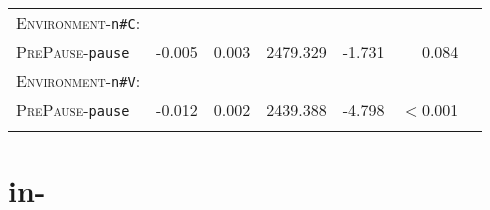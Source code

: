 \begin{table}
{\begin{tabular} {lrrrrrr}
		\textsc{Environment}-\texttt{n\#C}:&&&&&\\
		\textsc{PrePause}-\texttt{pause }&  \color{lsLightGray}-0.005& \color{lsLightGray}0.003& \color{lsLightGray}2479.329 &\color{lsLightGray} -1.731& \color{lsLightGray}0.084 \\ 
		
		\textsc{Environment}-\texttt{n\#V}:&&&&&\\
		\textsc{PrePause}-\texttt{pause} & -0.012 & 0.002& 2439.388& -4.798& $<$0.001 \\ 
		
	\lspbottomrule 
			\end{tabular}
}


\end{table}


\section{{in-}}



